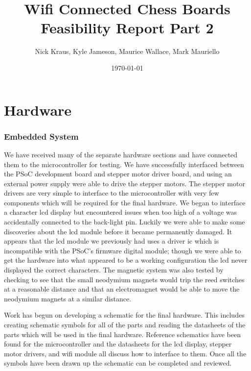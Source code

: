 \documentclass{article}
\title{Wifi Connected Chess Boards \\ \large Feasibility Report Part 2}
\author{Nick Kraus, Kyle Jameson, Maurice Wallace, Mark Mauriello}
\date{\today}
\begin{document}
\maketitle


\section*{Hardware}

\subsubsection*{Embedded System}
\indent

We have received many of the separate hardware sections and have connected them to the microcontroller for testing. We have successfully interfaced between the PSoC development board and stepper motor driver board, and using an external power supply were able to drive the stepper motors. The stepper motor drivers are very simple to interface to the microcontroller with very few components which will be required for the final hardware. We began to interface a character lcd display but encountered issues when too high of a voltage was accidentally connected to the back-light pin. Luckily we were able to make some discoveries about the lcd module before it became permanently damaged. It appears that the lcd module we previously had uses a driver ic which is incompatible with the PSoC's firmware digital module; though we were able to get the hardware into what appeared to be a working configuration the lcd never displayed the correct characters. The magnetic system was also tested by checking to see that the small neodymium magnets would trip the reed switches at a reasonable distance and that an electromagnet would be able to move the neodymium magnets at a similar distance.

\indent

Work has begun on developing a schematic for the final hardware. This includes creating schematic symbols for all of the parts and reading the datasheets of the parts which will be used in the final hardware. Reference schematics have been found for the microcontroller and the datasheets for the lcd display, stepper motor drivers, and wifi module all discuss how to interface to them. Once all the symbols have been drawn up the schematic can be completed and reviewed.

\end{document}
